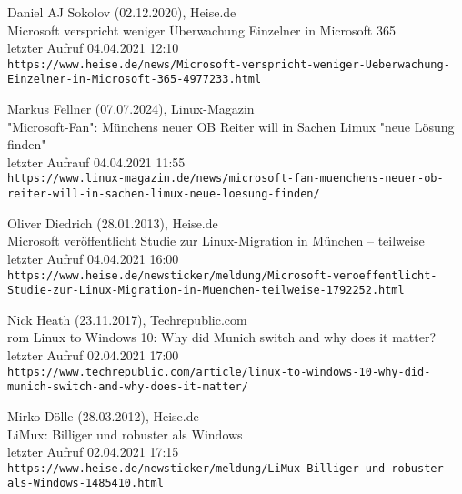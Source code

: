 \begin{thebibliography}{9}
    \bibitem{}
        Daniel AJ Sokolov (02.12.2020), Heise.de
        \\Microsoft verspricht weniger Überwachung Einzelner in Microsoft 365
        \\letzter Aufruf 04.04.2021 12:10
        \\\texttt{https://www.heise.de/news/Microsoft-verspricht-weniger-Ueberwachung-Einzelner-in-Microsoft-365-4977233.html}

    \bibitem{}
        Markus Fellner (07.07.2024), Linux-Magazin
        \\"Microsoft-Fan": Münchens neuer OB Reiter will in Sachen Limux "neue Lösung finden"
        \\letzter Aufrauf 04.04.2021 11:55
        \\\texttt{https://www.linux-magazin.de/news/microsoft-fan-muenchens-neuer-ob-reiter-will-in-sachen-limux-neue-loesung-finden/}

    \bibitem{}
        Oliver Diedrich (28.01.2013), Heise.de
        \\Microsoft veröffentlicht Studie zur Linux-Migration in München – teilweise
        \\letzter Aufruf 04.04.2021 16:00
        \\\texttt{https://www.heise.de/newsticker/meldung/Microsoft-veroeffentlicht-Studie-zur-Linux-Migration-in-Muenchen-teilweise-1792252.html}

    \bibitem{}
        Nick Heath (23.11.2017), Techrepublic.com
        \\rom Linux to Windows 10: Why did Munich switch and why does it matter?
        \\letzter Aufruf 02.04.2021 17:00
        \\\texttt{https://www.techrepublic.com/article/linux-to-windows-10-why-did-munich-switch-and-why-does-it-matter/}

    \bibitem{}
        Mirko Dölle (28.03.2012), Heise.de
        \\LiMux: Billiger und robuster als Windows
        \\letzter Aufruf 02.04.2021 17:15
        \\\texttt{https://www.heise.de/newsticker/meldung/LiMux-Billiger-und-robuster-als-Windows-1485410.html}

\end{thebibliography}